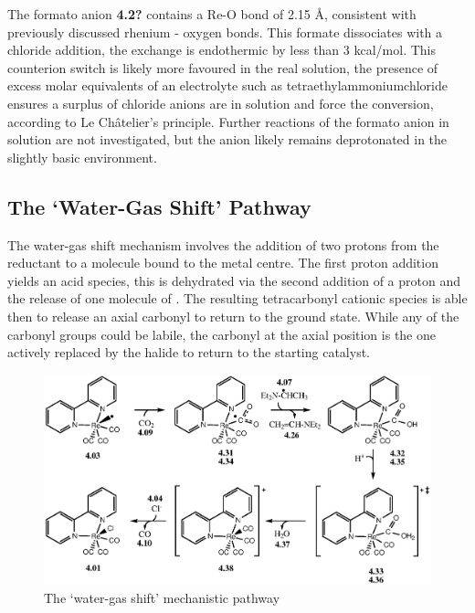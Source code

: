 The formato anion \textbf{4.2?} contains a Re-O bond of 2.15 \r{A}, consistent with previously discussed rhenium - oxygen bonds. This formate dissociates with a chloride addition, the exchange is endothermic by less than 3 kcal/mol. This counterion switch is likely more favoured in the real solution, the presence of excess molar equivalents of an electrolyte such as tetraethylammoniumchloride ensures a surplus of chloride anions are in solution and force the conversion, according to Le Ch\^{a}telier's principle. Further reactions of the formato anion in solution are not investigated, but the anion likely remains deprotonated in the slightly basic environment\autocite{morimoto2013}. 

\FloatBarrier

\subsection{The `Water-Gas Shift' Pathway}\label{ss.watergas}
The water-gas shift mechanism involves the addition of two protons from the reductant to a  molecule bound to the metal centre. The first proton addition yields an acid species, this is dehydrated via the second addition of a proton and the release of one molecule of . The resulting tetracarbonyl cationic species is able then to release an axial carbonyl to return to the ground state. While any of the carbonyl groups could be labile, the carbonyl at the axial position is the one actively replaced by the halide to return to the starting catalyst\autocite{shaver1992}. 

\begin{figure}[!htb]
 \begin{center}
  \includegraphics[clip=true, width=\textwidth, keepaspectratio]{images/watergas.eps}
 \end{center}
\caption{The `water-gas shift' mechanistic pathway}
\label{fig.watergas}
\end{figure} 

